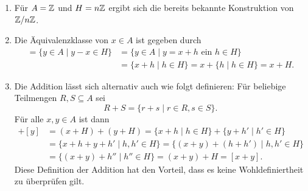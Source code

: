 \begin{bem}
 \begin{enumerate}[leftmargin=*]
  \item
   Für $A = \mathbb{Z}$ und $H = n\mathbb{Z}$ ergibt sich die bereits bekannte Konstruktion von $\mathbb{Z}/n\mathbb{Z}$.
  \item
   Die Äquivalenzklasse von $x \in A$ ist gegeben durch
   \begin{align*}
    [x]
    = \{y \in A \mid y-x \in H\}
    &= \{y \in A \mid \text{$y = x + h$ ein $h \in H$}\} \\
    &= \{x+h \mid h \in H\}
    = x + \{h \mid h \in H\}
    = x + H.
   \end{align*}
  \item
   Die Addition lässt sich alternativ auch wie folgt definieren: Für beliebige Teilmengen $R, S \subseteq A$ sei
   \[
    R + S = \{r+s \mid r \in R, s \in S\}.
   \]
   Für alle $x,y \in A$ ist dann
   \begin{align*}
    [x] + [y]
    &= (x+H) + (y+H)
    = \{x+h \mid h \in H\} + \{y+h' \mid h' \in H\} \\
    &= \{x+h+y+h' \mid h, h' \in H\}
    = \{(x+y)+(h+h') \mid h,h' \in H\} \\
    &= \{(x+y)+h'' \mid h'' \in H\}
    = (x+y)+H
    = [x+y].
   \end{align*}
   Diese Definition der Addition hat den Vorteil, dass es keine Wohldefiniertheit zu überprüfen gilt.
 \end{enumerate}
\end{bem}

























